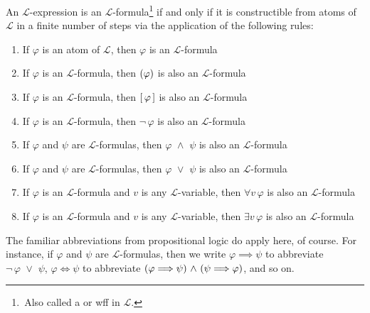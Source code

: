 \begin{dfn}[Formulas]
     \label{dfn:first-order-language-construction-of-formulas}
    An \( \mathcal{L} \)-expression is an \( \mathcal{L} \)-formula\footnote{\,Also called a  or wff in \( \mathcal{L} \).}
    if and only if it is constructible from atoms of \( \mathcal{L} \) in a finite number of steps via the application of the following rules:
    \begin{enumerate}[topsep=2pt,label=\textup{\texttt{(\alph*)}}]
        \item If \( \varphi \) is an atom of \( \mathcal{L} \), then \( \varphi \) is an \( \mathcal{L} \)-formula
        \item If \( \varphi \) is an \( \mathcal{L} \)-formula, then \( \mleft( \varphi \mright) \) is also an \( \mathcal{L} \)-formula
        \item If \( \varphi \) is an \( \mathcal{L} \)-formula, then \( \mleft[ \, \varphi \, \mright] \) is also an \( \mathcal{L} \)-formula
        \item If \( \varphi \) is an \( \mathcal{L} \)-formula, then \( \lnot \, \varphi \) is also an \( \mathcal{L} \)-formula
        \item If \( \varphi \) and \( \psi \) are \( \mathcal{L} \)-formulas, then \( \varphi \,\,{\land}\,\, \psi \) is also an \( \mathcal{L} \)-formula
        \item If \( \varphi \) and \( \psi \) are \( \mathcal{L} \)-formulas, then \( \varphi \,\,{\lor}\,\, \psi \) is also an \( \mathcal{L} \)-formula
        \item If \( \varphi \) is an \( \mathcal{L} \)-formula and \( v \) is any \( \mathcal{L} \)-variable,
            then \( \forall v \, \varphi \) is also an \( \mathcal{L} \)-formula
        \item If \( \varphi \) is an \( \mathcal{L} \)-formula and \( v \) is any \( \mathcal{L} \)-variable,
            then \( \exists v \, \varphi \) is also an \( \mathcal{L} \)-formula
    \end{enumerate}
\end{dfn}

\begin{notation}
    The familiar abbreviations from propositional logic do apply here, of course. For instance, if \( \varphi \) and \( \psi \) are
    \( \mathcal{L} \)-formulas, then we write \( \varphi {\implies} \psi \) to abbreviate \( \lnot \, \varphi \,\,{\lor}\,\, \psi \),
    \( \varphi {\iff} \psi \) to abbreviate \( \mleft( \varphi {\implies} \psi \mright) \,\,{\land}\,\, \mleft( \psi {\implies} \varphi \mright)  \), and so on.
\end{notation}

